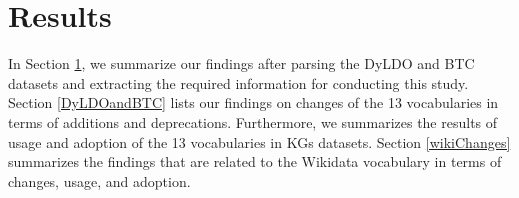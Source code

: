 
\section{Results}\label{sec:results}
In Section \ref{sec:results}, we summarize our findings after parsing the DyLDO and BTC datasets and extracting the required information for conducting this study. 
Section \ref{DyLDOandBTC} lists our findings on changes of the 13 vocabularies in terms of additions and deprecations.
Furthermore, we summarizes the results of usage and adoption of the 13 vocabularies in KGs datasets. 
Section \ref{wikiChanges} summarizes the findings that are related to the Wikidata vocabulary in terms of changes, usage, and adoption.

